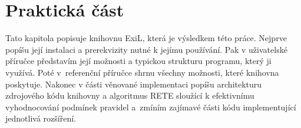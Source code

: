 \section{Praktická část}

Tato kapitola popisuje knihovnu ExiL, která je výsledkem této práce.
Nejprve popíšu její instalaci a prerekvizity nutné k jejímu používání. Pak v
uživatelské příručce představím její možnosti a typickou strukturu programu,
který ji využívá. Poté v~referenční příručce shrnu všechny možnosti, které
knihovna poskytuje. Nakonec v části věnované implementaci popíšu architekturu
zdrojového kódu knihovny a algoritmus RETE sloužící k efektivnímu vyhodnocování
podmínek pravidel a~zmíním zajímavé části kódu implementující jednotlivá
rozšíření.


\clearpage

\clearpage

% 
\clearpage


